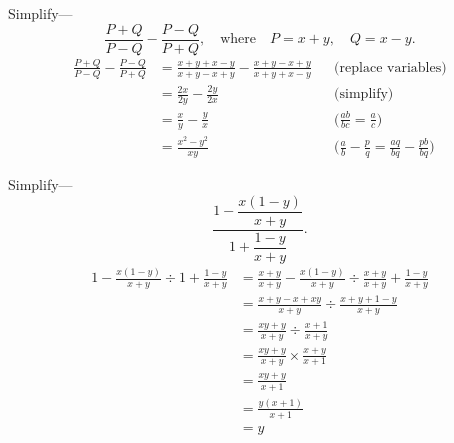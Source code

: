 \documentclass[DIN, pagenumber=false, fontsize=11pt, parskip=half]{scrartcl}
\begin{document}
\begin{problems}[from=1,step=1]
    \problem Simplify---
    \[
        \frac{P+Q}{P-Q} - \frac{P-Q}{P+Q}, \quad\text{where}\quad P = x+y, \quad Q = x-y.
    \]
    \answer
    \begin{align*}
        \frac{P + Q}{P - Q} - \frac{P - Q}{P + Q} &= \frac{x+y+x-y}{x+y-x+y} - \frac{x+y-x+y}{x+y+x-y} && \text{(replace variables)}\\ 
                                                  &= \frac{2x}{2y} - \frac{2y}{2x} && \text{(simplify)}\\ 
                                                  &= \frac{x}{y} - \frac{y}{x} && \text{($\frac{ab}{bc} = \frac{a}{c}$)}\\ 
                                                  &= \frac{x^2 - y^2}{xy} && \text{($\frac{a}{b} - \frac{p}{q} = \frac{aq}{bq} - \frac{pb}{bq}$)}
    \end{align*}
   
    \problem Simplify---
    \[
        \frac{1 - \dfrac{x(1-y)}{x+y}}{1 + \dfrac{1-y}{x+y}}.
    \]
    \answer 
    \begin{align*}
        1-\frac{x(1-y)}{x+y} \div 1+\frac{1-y}{x+y} &= \frac{x+y}{x+y}-\frac{x(1-y)}{x+y} \div \frac{x+y}{x+y} + \frac{1-y}{x+y}\\ 
                                                    &= \frac{x+y-x+xy}{x+y} \div \frac{x+y+1-y}{x+y}\\ 
                                                    &= \frac{xy+y}{x+y} \div \frac{x+1}{x+y}\\ 
                                                    &= \frac{xy+y}{x+y} \times \frac{x+y}{x+1}\\ 
                                                    &= \frac{xy+y}{x+1} \\ 
                                                    &= \frac{y(x+1)}{x+1}\\ 
                                                    &= y
    \end{align*}


\end{problems}
\end{document}
